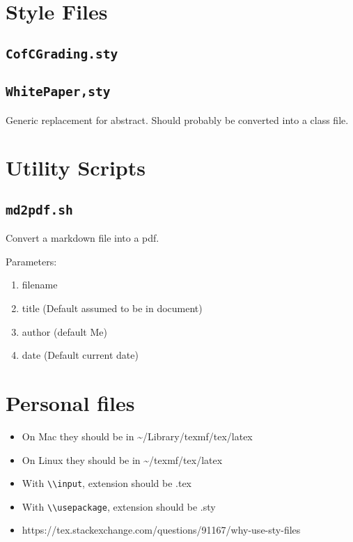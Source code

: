 \documentclass[
]{md2pdf}
\providecommand{\tightlist}{%
  \setlength{\itemsep}{0pt}\setlength{\parskip}{0pt}}
\begin{document}
\hypertarget{style-files-1}{%
\section{Style Files}\label{style-files-1}}

\hypertarget{cofcgrading.sty}{%
\subsection{\texorpdfstring{\texttt{CofCGrading.sty}}{CofCGrading.sty}}\label{cofcgrading.sty}}

\hypertarget{whitepapersty}{%
\subsection{\texorpdfstring{\texttt{WhitePaper,sty}}{WhitePaper,sty}}\label{whitepapersty}}

Generic replacement for abstract. Should probably be converted into a
class file.

\hypertarget{utility-scripts}{%
\section{Utility Scripts}\label{utility-scripts}}

\hypertarget{md2pdf.sh}{%
\subsection{\texorpdfstring{\texttt{md2pdf.sh}}{md2pdf.sh}}\label{md2pdf.sh}}

Convert a markdown file into a pdf.

Parameters:

\begin{enumerate}
\def\labelenumi{\arabic{enumi}.}
\tightlist
\item
  filename
\item
  title (Default assumed to be in document)
\item
  author (default Me)
\item
  date (Default current date)
\end{enumerate}

\hypertarget{personal-files}{%
\section{Personal files}\label{personal-files}}

\begin{itemize}
\tightlist
\item
  On Mac they should be in \textasciitilde/Library/texmf/tex/latex
\item
  On Linux they should be in \textasciitilde/texmf/tex/latex
\item
  With \texttt{\textbackslash{}\textbackslash{}input}, extension should
  be .tex
\item
  With \texttt{\textbackslash{}\textbackslash{}usepackage}, extension
  should be .sty
\item
  https://tex.stackexchange.com/questions/91167/why-use-sty-files
\end{itemize}
\end{document}
